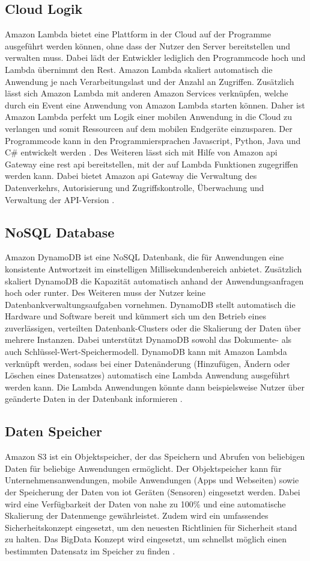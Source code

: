\subsection{Cloud Logik}
Amazon Lambda bietet eine Plattform in der Cloud auf der Programme ausgeführt werden können, ohne dass der Nutzer den Server bereitstellen und verwalten muss. Dabei lädt der Entwickler lediglich den Programmcode hoch und Lambda übernimmt den Rest. Amazon Lambda skaliert automatisch die Anwendung je nach Verarbeitungslast und der Anzahl an Zugriffen. Zusätzlich lässt sich Amazon Lambda mit anderen Amazon Services verknüpfen, welche durch ein Event eine Anwendung von Amazon Lambda starten können. Daher ist Amazon Lambda perfekt um Logik einer mobilen Anwendung in die Cloud zu verlangen und somit Ressourcen auf dem mobilen Endgeräte einzusparen. Der Programmcode kann in den Programmiersprachen Javascript, Python, Java und C\# entwickelt werden \cite{AmazonLambda}. Des Weiteren lässt sich mit Hilfe von Amazon \gls{api} Gateway eine \gls{rest} \gls{api} bereitstellen, mit der auf Lambda Funktionen zugegriffen werden kann. Dabei bietet Amazon \gls{api} Gateway die Verwaltung des Datenverkehrs, Autorisierung und Zugriffskontrolle, Überwachung und Verwaltung der API-Version \cite{AmazonAPIGateway}.

\subsection{NoSQL Database}
Amazon DynamoDB ist eine NoSQL Datenbank, die für Anwendungen eine konsistente Antwortzeit im einstelligen Millisekundenbereich anbietet. Zusätzlich skaliert DynamoDB die Kapazität automatisch anhand der Anwendungsanfragen hoch oder runter. Des Weiteren muss der Nutzer keine Datenbankverwaltungsaufgaben vornehmen. DynamoDB stellt automatisch die Hardware und Software bereit und kümmert sich um den Betrieb eines zuverlässigen, verteilten Datenbank-Clusters oder die Skalierung der Daten über mehrere Instanzen. Dabei unterstützt DynamoDB sowohl das Dokumente- als auch Schlüssel-Wert-Speichermodell. DynamoDB kann mit Amazon Lambda verknüpft werden, sodass bei einer Datenänderung (Hinzufügen, Ändern oder Löschen eines Datensatzes) automatisch eine Lambda Anwendung ausgeführt werden kann. Die Lambda Anwendungen könnte dann beispielsweise Nutzer über geänderte Daten in der Datenbank informieren \cite{AmazonDynamoDB}. 

\subsection{Daten Speicher}
Amazon S3 ist ein Objektspeicher, der das Speichern und Abrufen von beliebigen Daten für beliebige Anwendungen ermöglicht. Der Objektspeicher kann für Unternehmensanwendungen, mobile Anwendungen (Apps und Webseiten) sowie der Speicherung der Daten von \acs{iot} Geräten (Sensoren) eingesetzt werden. Dabei wird eine Verfügbarkeit der Daten von nahe zu 100\% und eine automatische Skalierung der Datenmenge gewährleistet. Zudem wird ein umfassendes Sicherheitskonzept eingesetzt, um den neuesten Richtlinien für Sicherheit stand zu halten. Das BigData Konzept wird eingesetzt, um schnellst möglich einen bestimmten Datensatz im Speicher zu finden \cite{AmazonE3}.

